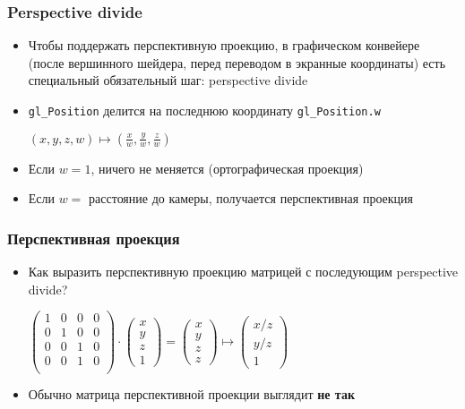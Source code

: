 \documentclass{beamer}
\begin{document}
\begin{frame}[fragile]
\frametitle{Perspective divide}
\begin{itemize}
\item Чтобы поддержать перспективную проекцию, в графическом конвейере (после вершинного шейдера, перед переводом в экранные координаты) есть специальный обязательный шаг: perspective divide
\pause
\item \verb|gl_Position| делится на последнюю координату \verb|gl_Position.w|
\begin{center}
\begin{math}
(x, y, z, w) \mapsto \left(\frac{x}{w}, \frac{y}{w}, \frac{z}{w}\right)
\end{math}
\end{center}
\pause
\item Если \begin{math}w=1\end{math}, ничего не меняется (ортографическая проекция)
\pause
\item Если \begin{math}w=\end{math} расстояние до камеры, получается перспективная проекция
\end{itemize}
\end{frame}

\begin{frame}[fragile]
\frametitle{Перспективная проекция}
\begin{itemize}
\item Как выразить перспективную проекцию матрицей с последующим perspective divide?
\pause
\begin{center}
\begin{math}
\begin{pmatrix}
1 & 0 & 0 & 0 \\
0 & 1 & 0 & 0 \\
0 & 0 & 1 & 0 \\
0 & 0 & 1 & 0 \\
\end{pmatrix}
\cdot
\begin{pmatrix}
x \\ y \\ z \\ 1
\end{pmatrix}
=
\begin{pmatrix}
x \\ y \\ z \\ z
\end{pmatrix}
\mapsto
\begin{pmatrix}
x/z \\ y/z \\ 1
\end{pmatrix}
\end{math}
\end{center}
\pause
\item Обычно матрица перспективной проекции выглядит \textbf{не так}
\end{itemize}
\end{frame}
\end{document}
